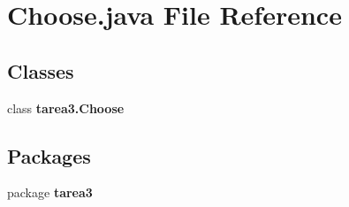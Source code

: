 \section{Choose.\+java File Reference}
\label{_choose_8java}
\subsection*{Classes}
\begin{DoxyCompactItemize}
\item 
class {\bf tarea3.\+Choose}
\end{DoxyCompactItemize}
\subsection*{Packages}
\begin{DoxyCompactItemize}
\item 
package {\bf tarea3}
\end{DoxyCompactItemize}
